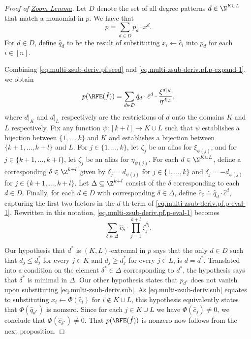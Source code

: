 \begin{proof}[Proof of \texorpdfstring{\hyperref[lem.multi-zsub-deriv]{Zoom Lemma}}{Zoom Lemma}]
  Let $D$ denote the set of all degree patterns $d \in \N^{K \cup L}$ that
  match a monomial in $p$.
  We have that
  \begin{equation} \label{eq.multi-zsub-deriv.pf.p-expand-1}
    p = \sum_{d\in D} p_d \cdot x^d.
  \end{equation}
  For $d \in D$, define \(\hat{q}_d\) to be the result of substituting
  \(x_i \gets \hat{c}_i\) into $p_d$ for each $i \in [n]$.

  Combining \eqref{eq.multi-zsub-deriv.pf.seed} and
  \eqref{eq.multi-zsub-deriv.pf.p-expand-1},
  we obtain
  \begin{equation}\label{eq.multi-zsub-deriv.pf.p-eval-1}
    p(\RFE(\hat{f}))
    =
    \sum_{d\in D} \hat{q}_d \cdot \hat{c}^d \cdot
      \frac{\xi^{d|_K}}{\eta^{d|_L}},
  \end{equation}
  where \(d|_K\) and \(d|_L\) respectively are the restrictions of \(d\) onto the domains \(K\) and \(L\) respectively.
  Fix any function \(\psi : [k+l] \to K\cup L\) such that
  \(\psi\) establishes a bijection between \(\{1,\ldots,k\}\) and \(K\)
  and establishes a bijection between \(\{k+1,\ldots,k+l\}\) and \(L\).
  For $j \in \{1,\dots,k\}$, let \(\zeta_j\) be an alias for \(\xi_{\psi(j)}\),
  and for $j \in \{k+1,\dots,k+l\}$, let \(\zeta_j\) be an alias for
  \(\eta_{\psi(j)}\).
  For each \(d \in \N^{K\cup L}\),
  define a corresponding \(\delta \in \Z^{k+l}\) given by
  \(\delta_j = d_{\psi(j)}\) for $j \in \{1,\dots,k\}$ and
  \(\delta_j = -d_{\psi(j)}\) for $j \in \{k+1,\dots,k+l\}$.
  Let \(\Delta \subseteq \Z^{k+l}\) consist of the \(\delta\) corresponding
  to each \(d \in D\).
  Finally, for each \(d \in D\) with corresponding \(\delta \in \Delta\),
  define
  $\hat{c}_\delta \doteq \hat{q}_d \cdot \hat{c}^d$,
  capturing the first two factors in the \(d\)-th term of
  \eqref{eq.multi-zsub-deriv.pf.p-eval-1}.
  Rewritten in this notation,
  \eqref{eq.multi-zsub-deriv.pf.p-eval-1} becomes
  \begin{equation}
    \sum_{\delta\in \Delta}
      \hat{c}_\delta \cdot
      \prod_{j=1}^{k+l} \zeta_j^{\delta_j}.
  \end{equation}

  Our hypothesis that $d^*$ is \((K,L)\)-extremal in \(p\)
  says that the only \(d \in D\) such that $d_j \le d^*_j$ for every $j \in K$
  and $d_j \ge d^*_j$ for every $j \in L$, is $d = d^*$.
  Translated into a condition on the element $\delta^* \in \Delta$
  corresponding to $d^*$,
  the hypothesis says that $\delta^*$ is minimal in $\Delta$.
  Our other hypothesis states that $p_{d^*}$ does not
  vanish upon substituting \eqref{eq.multi-zsub-deriv.sub}.
  As \eqref{eq.multi-zsub-deriv.sub} equates to substituting
  \(x_i \gets \Phi(\hat{c}_i)\) for \(i \not\in K \cup L\),
  this hypothesis equivalently states that \(\Phi(\hat{q}_{d^*})\) is nonzero.
  Since for each \(j \in K \cup L\) we have \(\Phi(\hat{c}_j) \ne 0\),
  we conclude that \(\Phi(\hat{c}_{\delta^*}) \ne 0\).
  That \(p(\RFE(\hat{f}))\) is nonzero now follows from the next proposition.
\end{proof}

